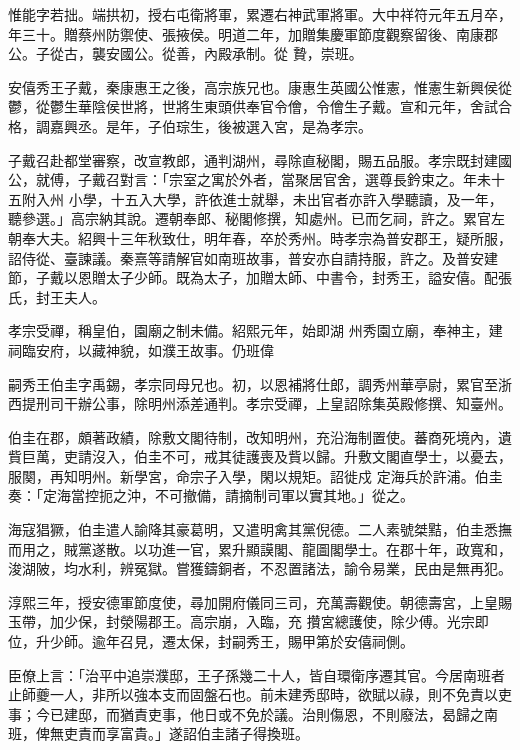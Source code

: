 \begin{pinyinscope}
 惟能字若拙。端拱初，授右屯衛將軍，累遷右神武軍將軍。大中祥符元年五月卒，年三十。贈蔡州防禦使、張掖侯。明道二年，加贈集慶軍節度觀察留後、南康郡公。子從古，襲安國公。從善，內殿承制。從
 贄，崇班。



 安僖秀王子戴，秦康惠王之後，高宗族兄也。康惠生英國公惟憲，惟憲生新興侯從鬱，從鬱生華陰侯世將，世將生東頭供奉官令儈，令儈生子戴。宣和元年，舍試合格，調嘉興丞。是年，子伯琮生，後被選入宮，是為孝宗。



 子戴召赴都堂審察，改宣教郎，通判湖州，尋除直秘閣，賜五品服。孝宗既封建國公，就傅，子戴召對言：「宗室之寓於外者，當聚居官舍，選尊長鈐束之。年未十五附入州
 小學，十五入大學，許依進士就舉，未出官者亦許入學聽讀，及一年，聽參選。」高宗納其說。遷朝奉郎、秘閣修撰，知處州。已而乞祠，許之。累官左朝奉大夫。紹興十三年秋致仕，明年春，卒於秀州。時孝宗為普安郡王，疑所服，詔侍從、臺諫議。秦熹等請解官如南班故事，普安亦自請持服，許之。及普安建節，子戴以恩贈太子少師。既為太子，加贈太師、中書令，封秀王，謚安僖。配張氏，封王夫人。



 孝宗受禪，稱皇伯，園廟之制未備。紹熙元年，始即湖
 州秀園立廟，奉神主，建祠臨安府，以藏神貌，如濮王故事。仍班偉



 嗣秀王伯圭字禹錫，孝宗同母兄也。初，以恩補將仕郎，調秀州華亭尉，累官至浙西提刑司干辦公事，除明州添差通判。孝宗受禪，上皇詔除集英殿修撰、知臺州。



 伯圭在郡，頗著政績，除敷文閣待制，改知明州，充沿海制置使。蕃商死境內，遺貲巨萬，吏請沒入，伯圭不可，戒其徒護喪及貲以歸。升敷文閣直學士，以憂去，服闋，再知明州。新學宮，命宗子入學，閑以規矩。詔徙戍
 定海兵於許浦。伯圭奏：「定海當控扼之沖，不可撤備，請摘制司軍以實其地。」從之。



 海寇猖獗，伯圭遣人諭降其豪葛明，又遣明禽其黨倪德。二人素號桀黠，伯圭悉撫而用之，賊黨遂散。以功進一官，累升顯謨閣、龍圖閣學士。在郡十年，政寬和，浚湖陂，均水利，辨冤獄。嘗獲鑄銅者，不忍置諸法，諭令易業，民由是無再犯。



 淳熙三年，授安德軍節度使，尋加開府儀同三司，充萬壽觀使。朝德壽宮，上皇賜玉帶，加少保，封滎陽郡王。高宗崩，入臨，充
 攢宮總護使，除少傅。光宗即位，升少師。逾年召見，遷太保，封嗣秀王，賜甲第於安僖祠側。



 臣僚上言：「治平中追崇濮邸，王子孫幾二十人，皆自環衛序遷其官。今居南班者止師夔一人，非所以強本支而固盤石也。前未建秀邸時，欲賦以祿，則不免責以吏事；今已建邸，而猶責吏事，他日或不免於議。治則傷恩，不則廢法，曷歸之南班，俾無吏責而享富貴。」遂詔伯圭諸子得換班。




\end{pinyinscope}
